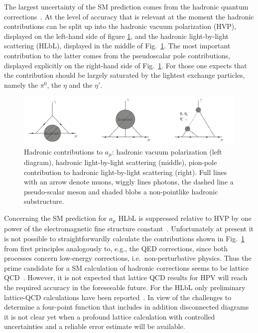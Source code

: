 The largest uncertainty of the SM prediction comes from
the hadronic quantum corrections~\cite{Jegerlehner:2009ry}.
At the level of accuracy that is relevant at the moment the hadronic
contributions can be split up into the hadronic vacuum polarization
(HVP), displayed on the left-hand side of figure \ref{fig:gm2}, and the
hadronic light-by-light scattering (HLbL), displayed in the middle of
Fig.~\ref{fig:gm2}. The most important contribution to the latter
comes from the pseudoscalar pole contributions, displayed explicitly on the right-hand 
side of Fig.~\ref{fig:gm2}. For those one expects that the contribution
should be largely saturated by the lightest exchange particles, namely the 
$\pi^0$, the $\eta$ and the $\eta'$. 
%
\begin{figure}[!h]
	\includegraphics[keepaspectratio,width=1.\textwidth]{figures/intro/hadronicgm2.pdf}
	\caption{Hadronic contributions to $a_\mu$: hadronic vacuum polarization (left diagram), 
		hadronic light-by-light scattering (middle), pion-pole contribution to hadronic light-by-light scattering (right). 
		Full lines with an arrow denote muons, wiggly lines photons, the dashed line a pseudo-scalar meson and shaded blobs a non-pointlike 
		hadronic substructure.
	}
	\label{fig:gm2}
\end{figure}

Concerning the SM prediction for $a_\mu$ HLbL is suppressed relative to HVP by one power of the electromagnetic
fine structure constant~\cite{Jegerlehner:2009ry,Bijnens:2007pz}.  
Unfortunately at present it is not possible to straightforwardly 
calculate the contributions shown in Fig.~\ref{fig:gm2} 
from first principles analogously to, e.g., the QED corrections, since
both processes concern low-energy corrections,
i.e.\ non-perturbative physics. Thus the prime candidate for a SM
calculation of hadronic corrections seems to be lattice QCD~\cite{Gattringer:2010zz}. 
However, it is not expected that lattice QCD
results for HPV will reach the required accuracy in the foreseeable future.
For the HLbL only preliminary lattice-QCD calculations have been reported~\cite{Blum:2014oka}.  
In view of the challenges to determine
a four-point function that includes in addition disconnected diagrams
it is not clear yet when a profound lattice calculation with
controlled uncertainties and a reliable error estimate will be
available.


